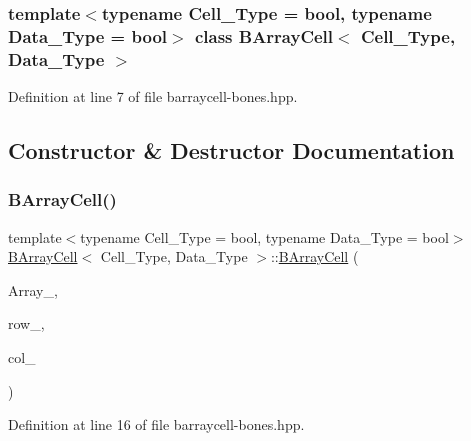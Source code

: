 \subsubsection*{template$<$typename Cell\+\_\+\+Type = bool, typename Data\+\_\+\+Type = bool$>$\newline
class B\+Array\+Cell$<$ Cell\+\_\+\+Type, Data\+\_\+\+Type $>$}



Definition at line 7 of file barraycell-\/bones.\+hpp.



\subsection{Constructor \& Destructor Documentation}
\mbox{\label{class_b_array_cell_a0ebc5e7ef22511ee4a04d737b1fe056c}} 
\subsubsection{\texorpdfstring{B\+Array\+Cell()}{BArrayCell()}}
{\footnotesize\ttfamily template$<$typename Cell\+\_\+\+Type = bool, typename Data\+\_\+\+Type = bool$>$ \\
\hyperlink{class_b_array_cell}{B\+Array\+Cell}$<$ Cell\+\_\+\+Type, Data\+\_\+\+Type $>$\+::\hyperlink{class_b_array_cell}{B\+Array\+Cell} (\begin{DoxyParamCaption}\item[{\hyperlink{class_b_array}{B\+Array}$<$ Cell\+\_\+\+Type, Data\+\_\+\+Type $>$ $\ast$}]{Array\+\_\+,  }\item[{\hyperlink{typedefs_8hpp_a91ad9478d81a7aaf2593e8d9c3d06a14}{uint}}]{row\+\_\+,  }\item[{\hyperlink{typedefs_8hpp_a91ad9478d81a7aaf2593e8d9c3d06a14}{uint}}]{col\+\_\+ }\end{DoxyParamCaption})\hspace{0.3cm}{\ttfamily [inline]}}



Definition at line 16 of file barraycell-\/bones.\+hpp.

\mbox{\label{class_b_array_cell_a6fbc56424caade490a72685cc35ad0e9}} 

